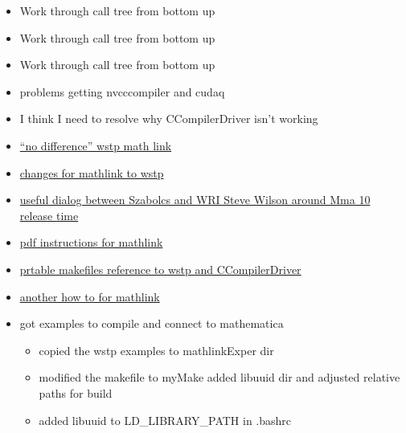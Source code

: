 \documentclass[hyperref,idxtotoc]{labbook}
\begin{document}
\begin{itemize}
\item Work through call tree from bottom up
\end{itemize}


\begin{itemize}
\item Work through call tree from bottom up
\end{itemize}



\begin{itemize}
\item Work through call tree from bottom up
\end{itemize}


   \begin{itemize}
   \item problems getting nvcccompiler and cudaq
   \item I think I need to resolve why CCompilerDriver isn't working
   \end{itemize}

   \begin{itemize}
  \item    \href{https://mathematica.stackexchange.com/questions/91558/what-is-the-difference-between-mathlink-and-wstp-which-one-should-i-use}{``no difference'' wstp math link}
\item \href{https://reference.wolfram.com/language/tutorial/WSTPInterface4.html}{changes for mathlink to wstp}
\item \href{https://community.wolfram.com/groups/-/m/t/295101}{useful dialog between Szabolcs and WRI Steve Wilson around Mma 10 release time}
\item \href{http://library.wolfram.com/infocenter/Books/8516/MathLinkDevelopmentInC.pdf}{pdf instructions for mathlink}
\item \href{https://mathematica.stackexchange.com/questions/154633/portable-makefile-for-wscc-builds}{prtable makefiles reference to wstp and CCompilerDriver}
\item \href{https://mathematica.stackexchange.com/questions/154633/portable-makefile-for-wscc-builds/154651#154651}{another  how to for mathlink}
\item got examples to compile and connect to mathematica
  \begin{itemize}
  \item copied the wstp examples to mathlinkExper dir
  \item modified the makefile to myMake added libuuid dir and adjusted relative paths for build
  \item added libuuid to LD\_LIBRARY\_PATH in .bashrc
  \end{itemize}
\end{itemize}








\printindex
\end{document}
